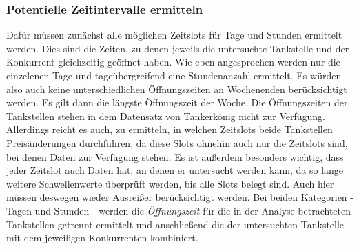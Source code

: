 \subsubsection{Potentielle Zeitintervalle ermitteln}
Dafür müssen zunächst alle möglichen Zeitslots für Tage und Stunden ermittelt werden. Dies sind die Zeiten, zu denen jeweils die untersuchte Tankstelle und der Konkurrent gleichzeitig geöffnet haben. Wie eben angesprochen werden nur die einzelenen Tage und tageübergreifend eine Stundenanzahl ermittelt. Es würden also auch keine unterschiedlichen Öffnungszeiten an Wochenenden berücksichtigt werden. Es gilt dann die längste Öffnungszeit der Woche. Die Öffnungszeiten der Tankstellen stehen in dem Datensatz von Tankerkönig nicht zur Verfügung. Allerdings reicht es auch, zu ermitteln, in welchen Zeitslots beide Tankstellen Preisänderungen durchführen, da diese Slots ohnehin auch nur die Zeitslots sind, bei denen Daten zur Verfügung stehen. Es ist außerdem besonders wichtig, dass jeder Zeitslot auch Daten hat, an denen er untersucht werden kann, da so lange weitere Schwellenwerte überprüft werden, bis alle Slots belegt sind. Auch hier müssen deswegen wieder Ausreißer berücksichtigt werden. Bei beiden Kategorien - Tagen und Stunden - werden die \textit{Öffnungszeit} für die in der Analyse betrachteten Tankstellen getrennt ermittelt und anschließend die der untersuchten Tankstelle mit dem jeweiligen Konkurrenten kombiniert.\\

